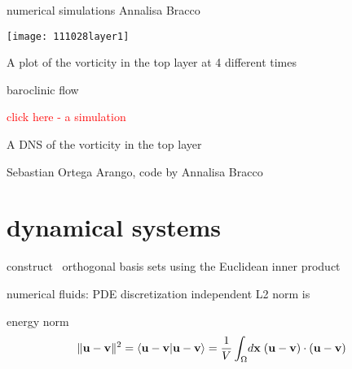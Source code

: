 \begin{frame}{numerical simulations}
{Annalisa Bracco}
\begin{block}{}
\begin{center}
    \texttt{[image: 111028layer1]}
\end{center}
A plot of the vorticity in the top layer at 4 different times
\end{block}
\end{frame}

\begin{frame}{baroclinic flow}
\begin{block}{}
\begin{center}
{\textcolor{red}{click here - a simulation}}
\end{center}
A DNS of the vorticity in the top layer
\end{block}

\vfill

{\scriptsize Sebastian Ortega Arango, code by
{Annalisa Bracco}
}
\end{frame}


\section[dynamical systems]{dynamical systems}

\begin{frame}{\statesp}
construct \statesp\ orthogonal basis sets using the Euclidean inner
product

\bigskip
numerical fluids:  PDE discretization independent L2 norm is
\begin{block}{energy norm}
\[
  \Norm{\bu-\bv}^2  = \braket{\bu-\bv}{\bu-\bv}  = \frac{1}{V}
                \int_\bCell \! d \bx \;
                       (\bu-\bv) \cdot (\bu-\bv)
\]
\end{block}
\end{frame}

\renewcommand{\ssp}{\ensuremath{a}}                %

